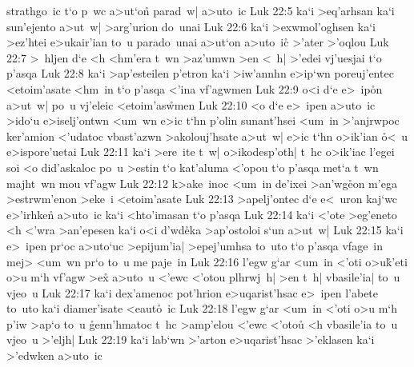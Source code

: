 strathgo~ic
t`o
p~wc
a>ut`on\r{}
parad~w|
a>uto~ic\bibvsend
\vs Luk 22:5
ka`i
>eq'arhsan
ka`i
sun'ejento
a>ut~w|
>arg'urion
do~unai\bibvsend
\vs Luk 22:6
ka`i
>exwmol'oghsen
ka`i
>ez'htei
e>ukair'ian
to~u
parado~unai
a>ut`on
a>uto~ic\r{}
>'ater
>'oqlou\bibvsend
\vs Luk 22:7
>~hljen
d`e
<h
<hm'era
t~wn
>az'umwn
>en
<~h|
>'edei
vj'uesjai
t`o
p'asqa\bibvsend
\vs Luk 22:8
ka`i
>ap'esteilen
p'etron
ka`i
>iw'annhn
e>ip`wn
poreuj'entec
<etoim'asate
<hm~in
t`o
p'asqa
<'ina
vf'agwmen\bibvsend
\vs Luk 22:9
o<i
d`e
e>~ip\r{o}n
a>ut~w|
po~u
vj'eleic
<etoim'as\r{w}men\bibvsend
{}
\vs Luk 22:10
<o
d`e
e>~ipen
a>uto~ic
>ido`u
e>iselj'ontwn
<um~wn
e>ic
t`hn
p'olin
sunant'hsei
<um~in
>'anjrwpoc
ker'amion
<'udatoc
vbast'azwn
>akolouj'hsate
a>ut~w|
e>ic
t`hn
o>ik'ian
\r{o}<~u
e>ispore'uetai\bibvsend
\vs Luk 22:11
ka`i
>ere~ite
t~w|
o>ikodesp'oth|
t~hc
o>ik'iac
l'egei
soi
<o
did'askaloc
po~u
>estin
t`o
kat'aluma
<'opou
t`o
p'asqa
met`a
t~wn
majht~wn
mou
vf'agw\bibvsend
\vs Luk 22:12
k>ake~inoc
<um~in
de'ixei
>an'wg\r{e}on
m'ega
>estrwm'enon
>eke~i
<etoim'asate\bibvsend
\vs Luk 22:13
>apelj'ontec
d`e
e<~uron
kaj`wc
e>'irhke\r{n}
a>uto~ic
ka`i
<hto'imasan
t`o
p'asqa\bibvsend
\vs Luk 22:14
ka`i
<'ote
>eg'eneto
<h
<'wra
>an'epesen
ka`i
o<i
d'wd\r{e}ka
>ap'ostoloi
s`un
a>ut~w|\bibvsend
\vs Luk 22:15
ka`i
e>~ipen
pr`oc
a>uto`uc
>epijum'ia|
>epej'umhsa
to~uto
t`o
p'asqa
vfage~in
mej>
<um~wn
pr`o
to~u
me
paje~in\bibvsend
\vs Luk 22:16
l'egw
g`ar
<um~in
<'oti
o>u\r{k}'eti
o>u
m`h
vf'agw
>ex\r{}
a>uto~u
<'ewc
<'otou
plhrwj~h|
>en
t~h|
vbasile'ia|
to~u
vjeo~u\bibvsend
\vs Luk 22:17
ka`i
dex'amenoc
pot'hrion
e>uqarist'hsac
e>~ipen
l'abete
to~uto
ka`i
diamer'isate
<eaut\r{o}~ic\bibvsend
{}
\vs Luk 22:18
l'egw
g`ar
<um~in
<'oti
o>u
m`h
p'iw
>ap`o
to~u
\r{g}enn'hmatoc
t~hc
>amp'elou
<'ewc
<'oto\r{u}
<h
vbasile'ia
to~u
vjeo~u
>'eljh|\bibvsend
\vs Luk 22:19
ka`i
lab`wn
>'arton
e>uqarist'hsac
>'eklasen
ka`i
>'edwken
a>uto~ic
